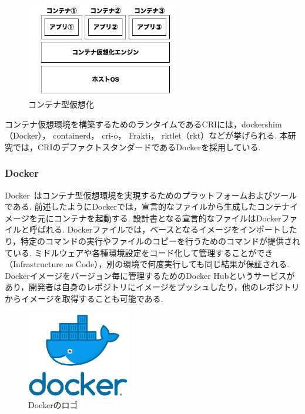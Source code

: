 \begin{figure}[htbp]
\begin{center}
    \includegraphics[width=0.6\textwidth]{./figures/docker-structure.jpg}
    \caption{コンテナ型仮想化}
\end{center}
\end{figure}

コンテナ仮想環境を構築するためのランタイムであるCRIには，dockershim（Docker）， containerd， cri-o， Frakti， rktlet（rkt）などが挙げられる.
本研究では，CRIのデファクトスタンダードであるDockerを採用している.

\subsubsection{Docker}
\label{background:container-orchestration-system:container:docker}

Docker~\cite{Docker}はコンテナ型仮想環境を実現するためのプラットフォームおよびツールである.
前述したようにDockerでは，宣言的なファイルから生成したコンテナイメージを元にコンテナを起動する.
設計書となる宣言的なファイルはDockerファイルと呼ばれる.
Dockerファイルでは，ベースとなるイメージをインポートしたり，特定のコマンドの実行やファイルのコピーを行うためのコマンドが提供されている.
ミドルウェアや各種環境設定をコード化して管理することができ（Infrastructure as Code），別の環境で何度実行しても同じ結果が保証される.
Dockerイメージをバージョン毎に管理するためのDocker Hubというサービスがあり，開発者は自身のレポジトリにイメージをプッシュしたり，他のレポジトリからイメージを取得することも可能である.

\begin{figure}[htbp]
\begin{center}
    \includegraphics[width=0.4\textwidth]{./figures/docker-logo.png}
    \caption{Dockerのロゴ}
\end{center}
\end{figure}

